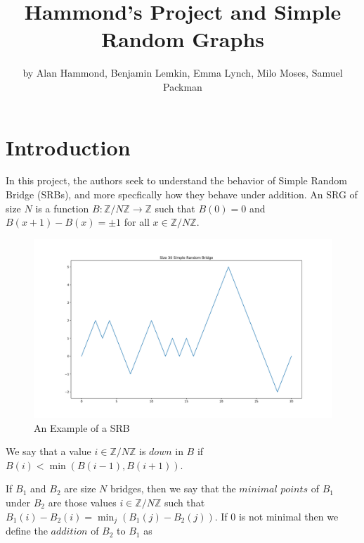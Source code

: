 \documentclass{article}
\title{Hammond's Project and Simple Random Graphs}
\author{by Alan Hammond, Benjamin Lemkin, Emma Lynch, Milo Moses, Samuel Packman}
\theoremstyle{definition}
\begin{document}
\maketitle

\newcommand{\lcm}{\mathrm{lcm}}


\tableofcontents
\newcommand{\R}{\mathbb{R}}
\newcommand{\Z}{\mathbb{Z}}
\newcommand{\N}{\mathbb{N}}
\newcommand{\C}{\mathbb{C}}
\newcommand{\class}{\mathcal{C}}
\newcommand{\E}{\mathbb{E}_{B}}
\newcommand{\Esup}{\mathbb{E}^{\mathrm{sup}}_{n\in\mathbb{N}}}
\newcommand{\rad}{\mathrm{rad}}


\section{Introduction}

In this project, the authors seek to understand the behavior of Simple Random Bridge (SRBs), and more specfically how they behave under addition. An SRG of size $N$ is a function $B:\Z/N\Z\to\Z$ such that $B(0)=0$ and $B(x+1)-B(x)=\pm 1$ for all $x\in \Z/N\Z$.

\begin{figure}[h]
\caption{An Example of a SRB}
\centering
\includegraphics[width=\textwidth]{Figure_1}
\end{figure}

We say that a value $i\in \Z/N\Z$ is $\mathit{down}$ in $B$ if $B(i)<\min(B(i-1),B(i+1))$.

If $B_1$ and $B_2$ are size $N$ bridges, then we say that the $\mathit{minimal \,\,points}$ of $B_1$ under $B_2$ are those values $i\in \Z/N\Z$ such that $B_1(i)-B_2(i)=\min_{j}\left(B_1(j)-B_2(j)\right)$. If $0$ is not minimal then we define the $\mathit{addition}$ of $B_2$ to $B_1$ as
\end{document}
